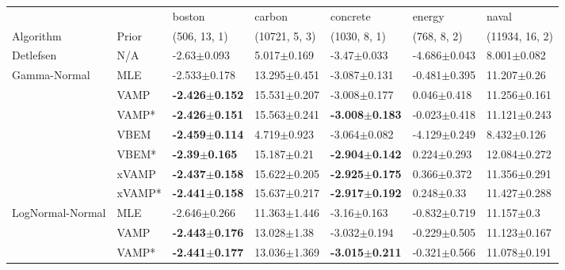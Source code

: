 \begin{tabular}{lllllll}
\toprule
        &     &                     boston &                     carbon &                   concrete &                   energy &                      naval \\
Algorithm & Prior& (506, 13, 1)& (10721, 5, 3)& (1030, 8, 1)& (768, 8, 2)& (11934, 16, 2)\\
\midrule
Detlefsen & N/A &            -2.63$\pm$0.093 &            5.017$\pm$0.169 &            -3.47$\pm$0.033 &         -4.686$\pm$0.043 &            8.001$\pm$0.082 \\
Gamma-Normal & MLE &           -2.533$\pm$0.178 &           13.295$\pm$0.451 &           -3.087$\pm$0.131 &         -0.481$\pm$0.395 &            11.207$\pm$0.26 \\
        & VAMP &  \textbf{-2.426$\pm$0.152} &           15.531$\pm$0.207 &           -3.008$\pm$0.177 &          0.046$\pm$0.418 &           11.256$\pm$0.161 \\
        & VAMP* &  \textbf{-2.426$\pm$0.151} &           15.563$\pm$0.241 &  \textbf{-3.008$\pm$0.183} &         -0.023$\pm$0.418 &           11.121$\pm$0.243 \\
        & VBEM &  \textbf{-2.459$\pm$0.114} &            4.719$\pm$0.923 &           -3.064$\pm$0.082 &         -4.129$\pm$0.249 &            8.432$\pm$0.126 \\
        & VBEM* &   \textbf{-2.39$\pm$0.165} &            15.187$\pm$0.21 &  \textbf{-2.904$\pm$0.142} &          0.224$\pm$0.293 &           12.084$\pm$0.272 \\
        & xVAMP &  \textbf{-2.437$\pm$0.158} &           15.622$\pm$0.205 &  \textbf{-2.925$\pm$0.175} &          0.366$\pm$0.372 &           11.356$\pm$0.291 \\
        & xVAMP* &  \textbf{-2.441$\pm$0.158} &           15.637$\pm$0.217 &  \textbf{-2.917$\pm$0.192} &           0.248$\pm$0.33 &           11.427$\pm$0.288 \\
LogNormal-Normal & MLE &           -2.646$\pm$0.266 &           11.363$\pm$1.446 &            -3.16$\pm$0.163 &         -0.832$\pm$0.719 &             11.157$\pm$0.3 \\
        & VAMP &  \textbf{-2.443$\pm$0.176} &            13.028$\pm$1.38 &           -3.032$\pm$0.194 &         -0.229$\pm$0.505 &           11.123$\pm$0.167 \\
        & VAMP* &  \textbf{-2.441$\pm$0.177} &           13.036$\pm$1.369 &  \textbf{-3.015$\pm$0.211} &         -0.321$\pm$0.566 &           11.078$\pm$0.191 \\

\end{tabular}
